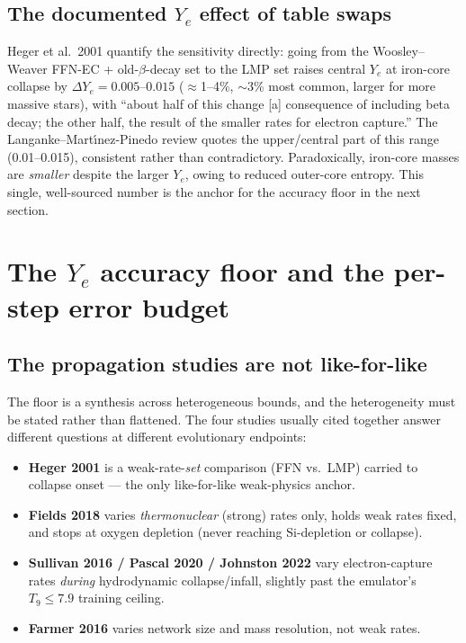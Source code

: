 \documentclass[11pt]{article}
\begin{document}
\subsection{The documented \texorpdfstring{$Y_e$}{Ye} effect of table swaps}

Heger et al.\ 2001 quantify the sensitivity directly: going from the Woosley--Weaver FFN-EC + old-$\beta$-decay set to the LMP set raises central $Y_e$ at iron-core collapse by $\Delta Y_e = 0.005$--$0.015$ ($\approx$1--4\%, $\sim$3\% most common, larger for more massive stars), with ``about half of this change [a] consequence of including beta decay; the other half, the result of the smaller rates for electron capture.'' The Langanke--Mart\'{\i}nez-Pinedo review quotes the upper/central part of this range (0.01--0.015), consistent rather than contradictory. Paradoxically, iron-core masses are \emph{smaller} despite the larger $Y_e$, owing to reduced outer-core entropy. This single, well-sourced number is the anchor for the accuracy floor in the next section.

\section{The \texorpdfstring{$Y_e$}{Ye} accuracy floor and the per-step error budget}

\subsection{The propagation studies are not like-for-like}

The floor is a synthesis across heterogeneous bounds, and the heterogeneity must be stated rather than flattened. The four studies usually cited together answer different questions at different evolutionary endpoints:
\begin{itemize}
\item \textbf{Heger 2001} is a weak-rate-\emph{set} comparison (FFN vs.\ LMP) carried to collapse onset --- the only like-for-like weak-physics anchor.
\item \textbf{Fields 2018} varies \emph{thermonuclear} (strong) rates only, holds weak rates fixed, and stops at oxygen depletion (never reaching Si-depletion or collapse).
\item \textbf{Sullivan 2016 / Pascal 2020 / Johnston 2022} vary electron-capture rates \emph{during} hydrodynamic collapse/infall, slightly past the emulator's $T_9 \le 7.9$ training ceiling.
\item \textbf{Farmer 2016} varies network size and mass resolution, not weak rates.
\end{itemize}
\end{document}
